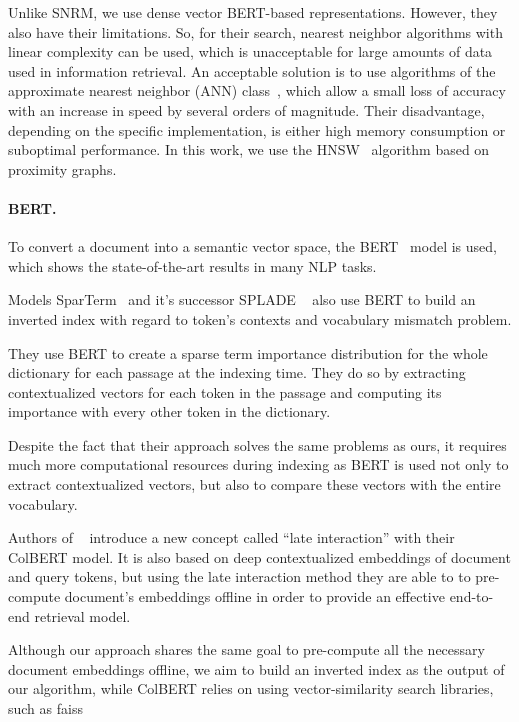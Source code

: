 \documentclass[
    twocolumn,
]{template/ceurart}
\begin{document}
    Unlike SNRM, we use dense vector BERT-based representations.
    However, they also have their limitations.
    So, for their search, nearest neighbor algorithms with linear complexity can be used,
    which is unacceptable for large amounts of data used in information retrieval.
    An acceptable solution is to use algorithms of the approximate nearest neighbor (ANN) class~\cite{ann},
    which allow a small loss of accuracy with an increase in speed by several orders of magnitude.
    Their disadvantage, depending on the specific implementation,
    is either high memory consumption or suboptimal performance.
    In this work, we use the HNSW~\cite{hnsw} algorithm based on proximity graphs.

    \paragraph{BERT.}
    To convert a document into a semantic vector space, the BERT~\cite{devlin2018bert} model is used,
    which shows the state-of-the-art results in many NLP tasks.

    Models SparTerm~\cite{sparTerm} and it's successor SPLADE ~\cite{splade} also use BERT to build an inverted
    index with regard to token's contexts and vocabulary mismatch problem.

    They use BERT to create a sparse term importance distribution for the whole dictionary for each passage at the indexing time.
    They do so by extracting contextualized vectors for each token in the passage and computing its importance with every other
    token in the dictionary.

    Despite the fact that their approach solves the same problems as ours, it requires much more computational resources during indexing
    as BERT is used not only to extract contextualized vectors, but also to compare these vectors with the
    entire vocabulary.

    Authors of ~\cite{colbert} introduce a new concept called ``late interaction'' with their ColBERT model.
    It is also based on deep contextualized embeddings of document and query tokens, but using the late interaction
    method they are able to to pre-compute document's embeddings offline in order to provide an effective end-to-end retrieval model.

    Although our approach shares the same goal to pre-compute all the necessary document embeddings offline, we aim to
    build an inverted index as the output of our algorithm, while ColBERT relies on using vector-similarity search libraries,
    such as faiss ~\cite{faiss}
\end{document}
